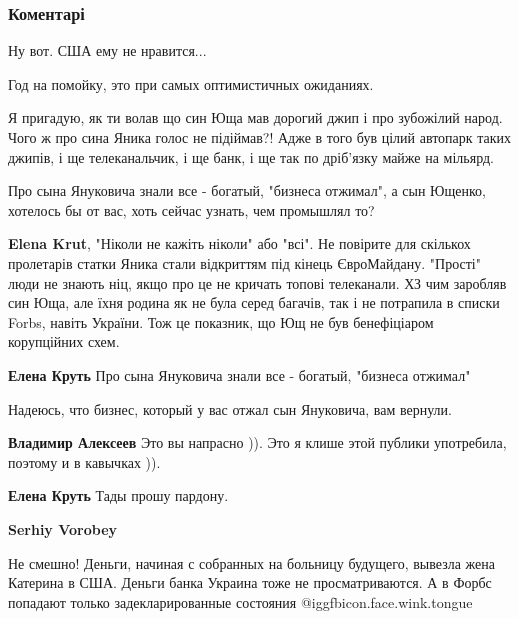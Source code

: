  
 
 
 
 
\subsubsection{Коментарі}

\begin{itemize} %
Ну вот. США ему не нравится...

Год на помойку, это при самых оптимистичных ожиданиях.

Я пригадую, як ти волав що син Юща мав дорогий джип і про зубожілий народ.
Чого ж про сина Яника голос не підіймав?! Адже в того був цілий автопарк таких джипів, і ще телеканальчик, і ще банк, і ще так по дріб'язку майже на мільярд.

\begin{itemize} %
Про сына Януковича знали все - богатый, "бизнеса отжимал", а сын Ющенко, хотелось бы от вас, хоть сейчас узнать, чем промышлял то?

\textbf{Elena Krut}, "Ніколи не кажіть ніколи" або "всі".
Не повірите для скількох пролетарів статки Яника стали відкриттям під кінець
ЄвроМайдану. "Прості" люди не знають ніц, якщо про це не кричать топові
телеканали.  ХЗ чим заробляв син Юща, але їхня родина як не була серед багачів,
так і не потрапила в списки Forbs, навіть України. Тож це показник, що Ющ не
був бенефіціаром корупційних схем.

\textbf{Елена Круть}
Про сына Януковича знали все - богатый, "бизнеса отжимал"

Надеюсь, что бизнес, который у вас отжал сын Януковича, вам вернули.

\textbf{Владимир Алексеев}
Это вы напрасно )). Это я клише этой публики употребила, поэтому и в кавычках )).

\textbf{Елена Круть} Тады прошу пардону.

\textbf{Serhiy Vorobey} 

Не смешно! Деньги, начиная с собранных на больницу будущего, вывезла жена Катерина
в США. Деньги банка Украина тоже не просматриваются. А в Форбс попадают только
задекларированные состояния  @igg{fbicon.face.wink.tongue} 


\end{itemize}
\end{itemize}
